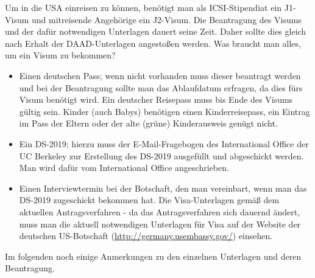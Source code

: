 \documentclass[a4paper]{scrreprt}
\begin{document}
Um in die USA einreisen zu können, benötigt man als ICSI-Stipendiat ein J1-Visum und mitreisende Angehörige ein J2-Visum. Die Beantragung des Visums und der dafür notwendigen Unterlagen dauert seine Zeit. Daher sollte dies gleich nach Erhalt der DAAD-Unterlagen angestoßen werden. Was braucht man alles, um ein Visum zu bekommen?

\begin{itemize}

  \item Einen deutschen Pass; wenn nicht vorhanden muss dieser beantragt werden und bei der Beantragung sollte man das Ablaufdatum erfragen, da dies fürs Visum benötigt wird. Ein deutscher Reisepass muss bis Ende des Visums gültig sein. Kinder (auch Babys) benötigen einen Kinderreisepass, ein Eintrag im Pass der Eltern oder der alte (grüne) Kinderausweis genügt nicht.

	\item Ein DS-2019; hierzu muss der E-Mail-Fragebogen des International Office der UC Berkeley zur Erstellung des DS-2019 ausgefüllt und abgeschickt werden. Man wird dafür vom International Office angeschrieben.
	
	\item Einen Interviewtermin bei der Botschaft, den man vereinbart, wenn man das DS-2019 zugeschickt bekommen hat. Die Visa-Unterlagen gemäß dem aktuellen Antragsverfahren - da das Antragsverfahren sich dauernd ändert, muss man die aktuell notwendigen Unterlagen für Visa auf der Website der deutschen US-Botschaft (\url{http://germany.usembassy.gov/}) einsehen.

\end{itemize}

Im folgenden noch einige Anmerkungen zu den einzelnen Unterlagen und deren Beantragung.
\end{document}

